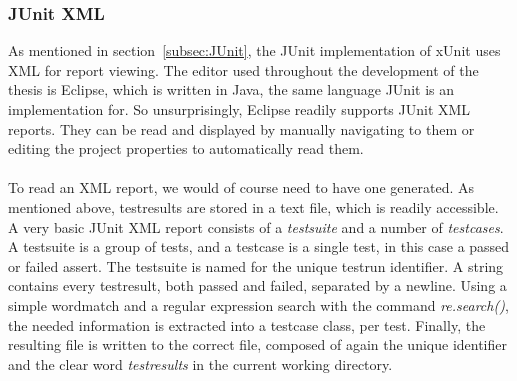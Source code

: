 \documentclass[11pt,british]{article}
\begin{document}
\subsubsection{JUnit XML}
As mentioned in section~\ref{subsec:JUnit}, the JUnit implementation of xUnit uses \gls{XML} for report viewing. The editor used throughout the development of the thesis is Eclipse, which is written in Java, the same language JUnit is an implementation for. So unsurprisingly, Eclipse readily supports JUnit XML reports. They can be read and displayed by manually navigating to them or editing the project properties to automatically read them.\\
\\
To read an XML report, we would of course need to have one generated. As mentioned above, testresults are stored in a text file, which is readily accessible. A very basic JUnit XML report consists of a \emph{testsuite} and a number of \emph{testcases}. A testsuite is a group of tests, and a testcase is a single test, in this case a passed or failed assert.
The testsuite is named for the unique testrun identifier. A string contains every testresult, both passed and failed, separated by a newline. Using a simple wordmatch and a regular expression search with the command \emph{re.search()}, the needed information is extracted into a testcase class, per test. Finally, the resulting file is written to the  correct file, composed of again the unique identifier and the clear word \emph{testresults} in the current working directory.\\
\end{document}
